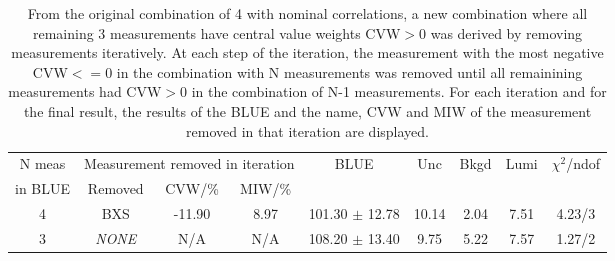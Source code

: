 \begin{table}[H]
\scriptsize
\begin{center}
\renewcommand{\arraystretch}{1.2}
\begin{tabular}{|c|c|c|c|c|ccc|c|}
\hline
N {\tiny meas} & \multicolumn{3}{c|}{Measurement removed in iteration} & \multirow{2}{*}{BLUE} & \multirow{2}{*}{\tiny Unc} & \multirow{2}{*}{\tiny Bkgd} & \multirow{2}{*}{\tiny Lumi} & \multirow{2}{*}{\tiny$\chi^2$/ndof}\\
\cline{2-4}
{\tiny in BLUE} & Removed & CVW/\% & MIW/\% & & & & & \\\hline
4 & BXS &     -11.90 &       8.97 &     101.30 $\pm$     12.78 &      10.14 &       2.04 &       7.51 &       4.23/3 \\
\hline
3 & {\em NONE} & N/A & N/A & 
    108.20 $\pm$     13.40 &       9.75 &       5.22 &       7.57 &       1.27/2 \\
\hline
\end{tabular}
\caption{From the original combination of 4 with nominal correlations, a new combination where all remaining 3 measurements have central value weights CVW$>$0 was derived by removing measurements iteratively. At each step of the iteration, the measurement with the most negative CVW$<=$0 in the combination with N measurements was removed until all remainining measurements had CVW$>$0 in the combination of N-1 measurements. For each iteration and for the final result, the results of the BLUE and the name, CVW and MIW of the measurement removed in that iteration are displayed.}
\renewcommand{\arraystretch}{1}
\end{center}
\end{table}
